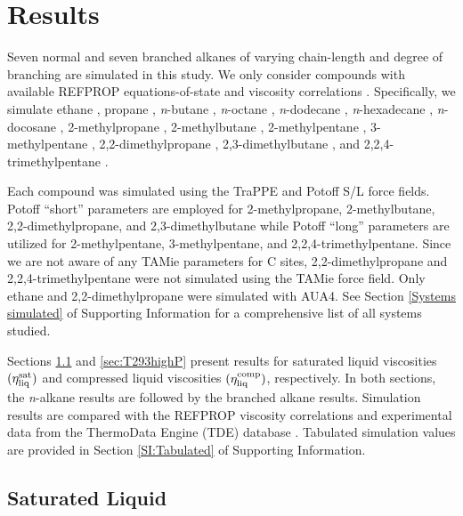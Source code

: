 \documentclass[preprint,review,12pt]{elsarticle}
\begin{document}
	\section{Results} \label{Results}
	
	Seven normal and seven branched alkanes of varying chain-length and degree of branching are simulated in this study. We only consider compounds with available REFPROP equations-of-state and viscosity correlations \cite{LEMMON-RP10}. Specifically, we simulate ethane \cite{Ethane2006,Vogel2015}, propane \cite{Propane2009,Vogel2016}, \textit{n}-butane \cite{Butane2006,Hermann2018}, \textit{n}-octane \cite{Beckmueller2017,Huber2004FPE}, \textit{n}-dodecane \cite{Lemmon2004,Huber2004}, \textit{n}-hexadecane \cite{Romeo2018,Vesovic2017}, \textit{n}-docosane \cite{Romeo2018,Huber2018}, 2-methylpropane \cite{Lemmon2006,Vogel2000}, 2-methylbutane \cite{Lemmon2006,Huber2018}, 2-methylpentane \cite{Lemmon2006,Huber2018}, 3-methylpentane \cite{Gao2017,Huber2018}, 2,2-dimethylpropane \cite{Lemmon2006,Huber2018}, 2,3-dimethylbutane \cite{Gao2017,Huber2018}, and 2,2,4-trimethylpentane \cite{Blackham2017,Huber2018}. 
	
	Each compound was simulated using the TraPPE and Potoff S/L force fields. Potoff ``short'' parameters are employed for 2-methylpropane, 2-methylbutane, 2,2-dimethylpropane, and 2,3-dimethylbutane while Potoff ``long'' parameters are utilized for 2-methylpentane, 3-methylpentane, and 2,2,4-trimethylpentane. Since we are not aware of any TAMie parameters for C sites, 2,2-dimethylpropane and 2,2,4-trimethylpentane were not simulated using the TAMie force field. Only ethane and 2,2-dimethylpropane were simulated with AUA4. See Section \ref{Systems simulated} of Supporting Information for a comprehensive list of all systems studied.
	
	Sections \ref{sec:eta_sat} and \ref{sec:T293highP} present results for saturated liquid viscosities $(\eta_{\rm liq}^{\rm sat})$ and compressed liquid viscosities $(\eta_{\rm liq}^{\rm comp})$, respectively. In both sections, the \textit{n}-alkane results are followed by the branched alkane results. Simulation results are compared with the REFPROP viscosity correlations and experimental data from the ThermoData Engine (TDE) database \cite{TDE}. Tabulated simulation values are provided in Section \ref{SI:Tabulated} of Supporting Information.
	
	\subsection{Saturated Liquid} \label{sec:eta_sat}
	
\end{document}

